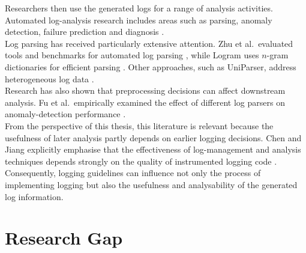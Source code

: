 Researchers then use the generated logs for a range of analysis activities. 
Automated log-analysis research includes areas such as parsing, anomaly detection, failure prediction 
and diagnosis \cite{he2021asurveyonautomatedloganalysis}.
\\
Log parsing has received particularly extensive attention. 
Zhu et al.\ evaluated tools and benchmarks for automated log parsing \cite{zhu2019toolsandbenchmarksforautomatedlogparsing}, 
while Logram uses $n$-gram dictionaries for efficient parsing \cite{dai2022logram}. 
Other approaches, such as UniParser, address heterogeneous log data \cite{liu2022uniparser}.
\\
Research has also shown that preprocessing decisions can affect downstream analysis. 
Fu et al.\ empirically examined the effect of different log parsers on anomaly-detection performance \cite{fu2022anempiricalstudy}.
\\
From the perspective of this thesis, this literature is relevant 
because the usefulness of later analysis partly depends on earlier logging decisions. 
Chen and Jiang explicitly emphasise that the effectiveness of log-management and analysis techniques depends 
strongly on the quality of instrumented logging code \cite{chen2021asurveyofsoftwareloginstrumentation}.
\\
Consequently, logging guidelines can influence not only the process of implementing logging 
but also the usefulness and analysability of the generated log information.

\section{Research Gap}
\label{sec:research_gap}

